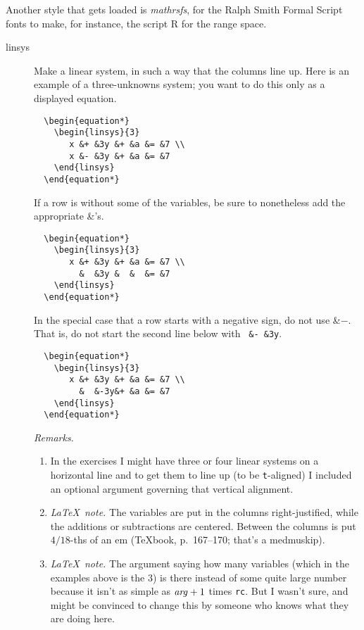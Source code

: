 \documentclass[titlepage]{article}
\newcommand{\latexnote}{\textit{\LaTeX\ note.} }
\begin{document}
Another style that gets loaded is \textit{mathrsfs}, for the 
Ralph Smith Formal Script fonts to make, for instance, the script R
for the range space.


\begin{description}
\item[linsys] 
  Make a linear system, in such a way that the columns line up.    
  Here is an example of a three-unknowns system; you want to
  do this only as a displayed equation.
\begin{verbatim}
  \begin{equation*}
    \begin{linsys}{3}
       x &+ &3y &+ &a &= &7 \\
       x &- &3y &+ &a &= &7 
    \end{linsys}
  \end{equation*}
\end{verbatim}
  If a row is without some of the variables, be sure to nonetheless
  add the appropriate \&'s.
\begin{verbatim}
  \begin{equation*}
    \begin{linsys}{3}
       x &+ &3y &+ &a &= &7 \\
         &  &3y &  &  &= &7 
    \end{linsys}
  \end{equation*}
\end{verbatim}
  In the special case that a row starts with a negative sign, do not 
  use \&$-$.
  That is, do not start the second line below with \verb! &- &3y!.
\begin{verbatim}
  \begin{equation*}
    \begin{linsys}{3}
       x &+ &3y &+ &a &= &7 \\
         &  &-3y&+ &a &= &7 
    \end{linsys}
  \end{equation*}
\end{verbatim}

  \textit{Remarks.}
  \begin{enumerate}
    \item 
      In the exercises I might have three or four linear systems on 
      a horizontal line and to get them to line up (to be \texttt{t}-aligned)
      I included an optional argument governing that vertical alignment.
    \item 
      \latexnote
      The variables are put in the columns right-justified, while the  
      additions or subtractions are centered.
      Between the columns is put $4/18$-ths of an em (\TeX book, p.~167--170;
      that's a medmuskip).
    \item
      \latexnote 
      The argument saying how many variables (which in the examples above
      is the $3$)
      is there instead of some quite large number because it isn't
      as simple as $\text{\textit{arg}}+1$ times \texttt{rc}.
      But I wasn't sure, and might be convinced to change this by someone
      who knows what they are doing here.
  \end{enumerate}


\end{description}
\end{document}
